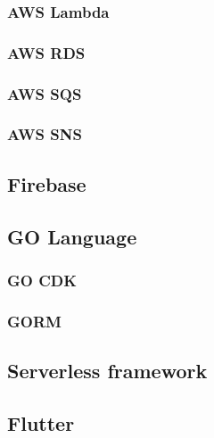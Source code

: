 \subsubsection{AWS Lambda}
\subsubsection{AWS RDS}
\subsubsection{AWS SQS}
\subsubsection{AWS SNS}
\subsection{Firebase}
\subsection{GO Language}
\subsubsection{GO CDK}
\subsubsection{GORM}
\subsection{Serverless framework}
\subsection{Flutter}
